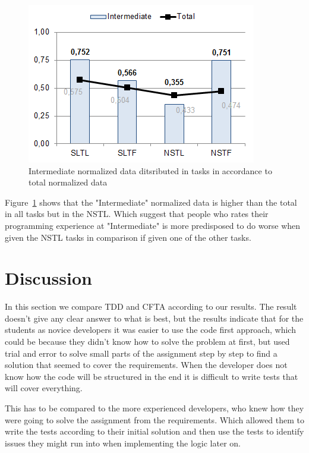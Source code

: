\documentclass{sig-alternate-05-2015}
\begin{document}
\begin{figure}[!ht]
	\centering
	\includegraphics[width=1\linewidth]{img12}
	\caption{Intermediate normalized data ditsributed in tasks in accordance to total normalized data}
	\label{fig:Intermediate normalized data ditsributed in tasks in accordance to total normalized data}
\end{figure}

Figure~\ref{fig:Intermediate normalized data ditsributed in tasks in accordance to total normalized data} shows that the "Intermediate" normalized data is higher than the total in all tasks but in the NSTL. Which suggest that people who rates their programming experience at "Intermediate" is more predisposed to do worse when given the NSTL tasks in comparison if given one of the other tasks.


\section{Discussion}
\label{sec:Discussion}
In this section we compare TDD and CFTA according to our results. The result doesn't give any clear answer to what is best, but the results indicate that for the students as novice developers it was easier to use the code first approach, which could be because they didn't know how to solve the problem at first, but used trial and error to solve small parts of the assignment step by step to find a solution that seemed to cover the requirements. When the developer does not know how the code will be structured in the end it is difficult to write tests that will cover everything.

This has to be compared to the more experienced developers, who knew how they were going to solve the assignment from the requirements. Which allowed them to write the tests according to their initial solution and then use the tests to identify issues they might run into when implementing the logic later on.
\end{document}

